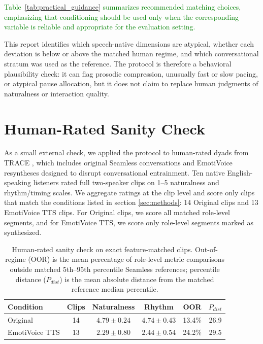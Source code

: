 \documentclass[conference]{IEEEtran}
\begin{document}
\textcolor{green}{Table~\ref{tab:practical_guidance} summarizes recommended matching choices, emphasizing that conditioning should be used only when the corresponding variable is reliable and appropriate for the evaluation setting.}

This report identifies which speech-native dimensions are atypical, whether each deviation is below or above the matched human regime, and which conversational stratum was used as the reference. 
The protocol is therefore a behavioral plausibility check: it can flag prosodic compression, unusually fast or slow pacing, or atypical pause allocation, but it does not claim to replace human judgments of naturalness or interaction quality.


\section{Human-Rated Sanity Check}\label{sec:human_eval_check}

As a small external check, we applied the protocol to human-rated dyads from TRACE \cite{TRACE}, which includes original Seamless conversations and EmotiVoice resyntheses designed to disrupt conversational entrainment. 
Ten native English-speaking listeners rated full two-speaker clips on 1--5 naturalness and rhythm/timing scales. 
We aggregate ratings at the clip level and score only clips that match the conditions listed in section \ref{sec:methods}: 14 Original clips and 13 EmotiVoice TTS clips.
For Original clips, we score all matched role-level segments, and for EmotiVoice TTS, we score only role-level segments marked as synthesized.

\begin{table}[t]
\centering
\caption{Human-rated sanity check on exact feature-matched clips. Out-of-regime (OOR) is the mean percentage of role-level metric comparisons outside matched 5th--95th percentile Seamless references; percentile distance ($P_{dist}$) is the mean absolute distance from the matched reference median percentile.}
\label{tab:human_eval_reference_check}
\small
\setlength{\tabcolsep}{3pt}
\begin{tabular}{l c c c c c}
\toprule
\textbf{Condition} & \textbf{Clips} & \textbf{Naturalness} & \textbf{Rhythm} & \textbf{OOR} & \textbf{$P_{dist}$} \\
\midrule
Original & 14 & $4.79 \pm 0.24$ & $4.74 \pm 0.43$ & 13.4\% & 26.9 \\
EmotiVoice TTS & 13 & $2.29 \pm 0.80$ & $2.44 \pm 0.54$ & 24.2\% & 29.5 \\
\bottomrule
\end{tabular}
\end{table}
\end{document}

